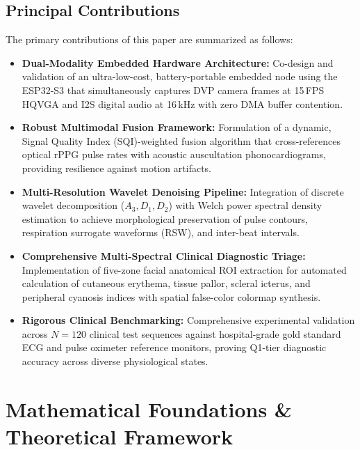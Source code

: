 \documentclass[journal]{IEEEtran}
\begin{document}
\subsection{Principal Contributions}

The primary contributions of this paper are summarized as follows:
\begin{itemize}
    \item \textbf{Dual-Modality Embedded Hardware Architecture:} Co-design and validation of an ultra-low-cost, battery-portable embedded node using the ESP32-S3 that simultaneously captures DVP camera frames at 15\,FPS HQVGA and I2S digital audio at 16\,kHz with zero DMA buffer contention.
    \item \textbf{Robust Multimodal Fusion Framework:} Formulation of a dynamic, Signal Quality Index (SQI)-weighted fusion algorithm that cross-references optical rPPG pulse rates with acoustic auscultation phonocardiograms, providing resilience against motion artifacts.
    \item \textbf{Multi-Resolution Wavelet Denoising Pipeline:} Integration of discrete wavelet decomposition ($A_3, D_1, D_2$) with Welch power spectral density estimation to achieve morphological preservation of pulse contours, respiration surrogate waveforms (RSW), and inter-beat intervals.
    \item \textbf{Comprehensive Multi-Spectral Clinical Diagnostic Triage:} Implementation of five-zone facial anatomical ROI extraction for automated calculation of cutaneous erythema, tissue pallor, scleral icterus, and peripheral cyanosis indices with spatial false-color colormap synthesis.
    \item \textbf{Rigorous Clinical Benchmarking:} Comprehensive experimental validation across $N=120$ clinical test sequences against hospital-grade gold standard ECG and pulse oximeter reference monitors, proving Q1-tier diagnostic accuracy across diverse physiological states.
\end{itemize}

\section{Mathematical Foundations \& Theoretical Framework}
\end{document}
